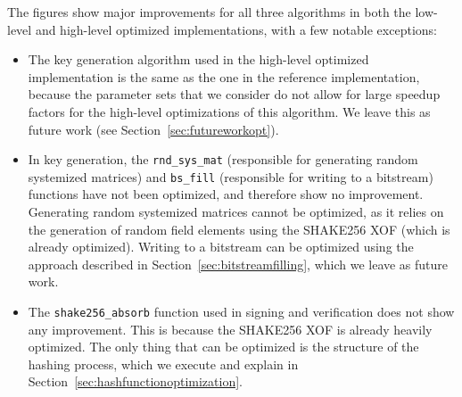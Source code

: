 \documentclass[11pt,a4paper]{report}
\theoremstyle{definition}
\begin{document}
The figures show major improvements for all three algorithms in both the low-level and high-level optimized implementations, with a few notable exceptions:
\begin{itemize}
  \item The key generation algorithm used in the high-level optimized implementation is the same as the one in the reference implementation, because the parameter sets that we consider do not allow for large speedup factors for the high-level optimizations of this algorithm. We leave this as future work (see Section~\ref{sec:futureworkopt}).
        \pagebreak
  \item In key generation, the \texttt{rnd\_sys\_mat} (responsible for generating random systemized matrices) and \texttt{bs\_fill} (responsible for writing to a bitstream) functions have not been optimized, and therefore show no improvement. Generating random systemized matrices cannot be optimized, as it relies on the generation of random field elements using the SHAKE256 XOF (which is already optimized). Writing to a bitstream can be optimized using the approach described in Section~\ref{sec:bitstreamfilling}, which we leave as future work.
  \item The \texttt{shake256\_absorb} function used in signing and verification does not show any improvement. This is because the SHAKE256 XOF is already heavily optimized. The only thing that can be optimized is the structure of the hashing process, which we execute and explain in Section~\ref{sec:hashfunctionoptimization}.
\end{itemize}
\end{document}
